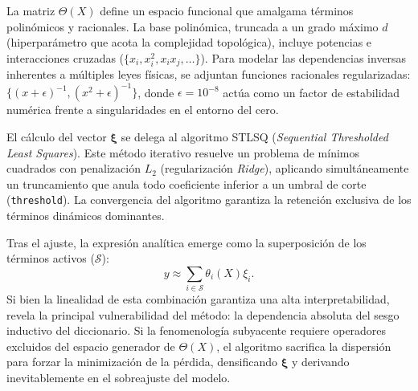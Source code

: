 \documentclass[11pt, a4paper]{article}
\begin{document}
La matriz $\Theta(X)$ define un espacio funcional que amalgama términos polinómicos y racionales. La base polinómica, truncada a un grado máximo $d$ (hiperparámetro que acota la complejidad topológica), incluye potencias e interacciones cruzadas ($\{x_i, x_i^2, x_i x_j, \dots\}$). Para modelar las dependencias inversas inherentes a múltiples leyes físicas, se adjuntan funciones racionales regularizadas: $\{ (x + \epsilon)^{-1}, (x^2 + \epsilon)^{-1} \}$, donde $\epsilon = 10^{-8}$ actúa como un factor de estabilidad numérica frente a singularidades en el entorno del cero.

El cálculo del vector $\boldsymbol{\xi}$ se delega al algoritmo STLSQ (\textit{Sequential Thresholded Least Squares}). Este método iterativo resuelve un problema de mínimos cuadrados con penalización $L_2$ (regularización \textit{Ridge}), aplicando simultáneamente un truncamiento que anula todo coeficiente inferior a un umbral de corte (\texttt{threshold}). La convergencia del algoritmo garantiza la retención exclusiva de los términos dinámicos dominantes.

Tras el ajuste, la expresión analítica emerge como la superposición de los términos activos ($\mathcal{S}$):\begin{equation}
y \approx \sum_{i \in \mathcal{S}} \theta_i(X) \xi_i.
\end{equation}
Si bien la linealidad de esta combinación garantiza una alta interpretabilidad, revela la principal vulnerabilidad del método: la dependencia absoluta del sesgo inductivo del diccionario. Si la fenomenología subyacente requiere operadores excluidos del espacio generador de $\Theta(X)$, el algoritmo sacrifica la dispersión para forzar la minimización de la pérdida, densificando $\boldsymbol{\xi}$ y derivando inevitablemente en el sobreajuste del modelo.
\end{document}
